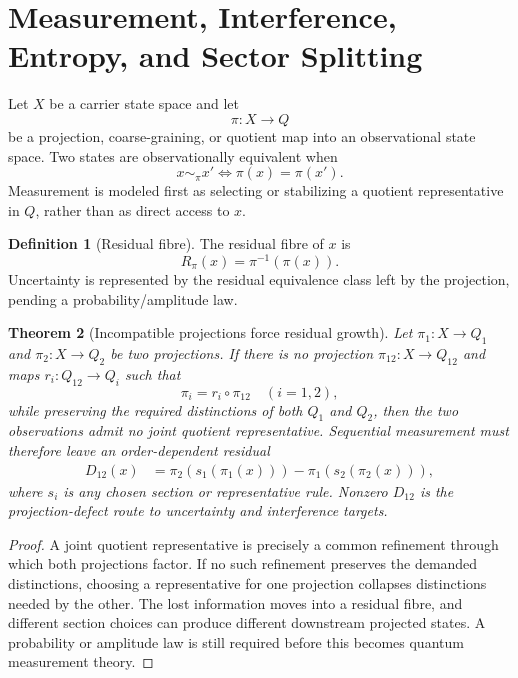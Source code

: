 \documentclass[11pt]{article}
\theoremstyle{definition}
\newtheorem{definition}{Definition}[section]
\theoremstyle{plain}
\newtheorem{theorem}[definition]{Theorem}
\theoremstyle{remark}
\begin{document}
\section{Measurement, Interference, Entropy, and Sector Splitting}

Let \(X\) be a carrier state space and let
\[
\pi:X\to Q
\]
be a projection, coarse-graining, or quotient map into an observational state
space. Two states are observationally equivalent when
\[
x\sim_\pi x' \Longleftrightarrow \pi(x)=\pi(x').
\]
Measurement is modeled first as selecting or stabilizing a quotient
representative in \(Q\), rather than as direct access to \(x\).

\begin{definition}[Residual fibre]
The residual fibre of \(x\) is
\[
R_\pi(x)=\pi^{-1}(\pi(x)).
\]
Uncertainty is represented by the residual equivalence class left by the
projection, pending a probability/amplitude law.
\end{definition}

\begin{theorem}[Incompatible projections force residual growth]
Let \(\pi_1:X\to Q_1\) and \(\pi_2:X\to Q_2\) be two projections. If there is
no projection \(\pi_{12}:X\to Q_{12}\) and maps \(r_i:Q_{12}\to Q_i\) such
that
\[
\pi_i=r_i\circ\pi_{12}
\quad(i=1,2),
\]
while preserving the required distinctions of both \(Q_1\) and \(Q_2\), then
the two observations admit no joint quotient representative. Sequential
measurement must therefore leave an order-dependent residual
\[
\begin{aligned}
D_{12}(x)
&=
\pi_2\!\left(s_1(\pi_1(x))\right)
-
\pi_1\!\left(s_2(\pi_2(x))\right),
\end{aligned}
\]
where \(s_i\) is any chosen section or representative rule. Nonzero
\(D_{12}\) is the projection-defect route to uncertainty and interference
targets.
\end{theorem}

\begin{proof}
A joint quotient representative is precisely a common refinement through
which both projections factor. If no such refinement preserves the demanded
distinctions, choosing a representative for one projection collapses
distinctions needed by the other. The lost information moves into a residual
fibre, and different section choices can produce different downstream
projected states. A probability or amplitude law is still required before
this becomes quantum measurement theory.
\end{proof}
\end{document}
